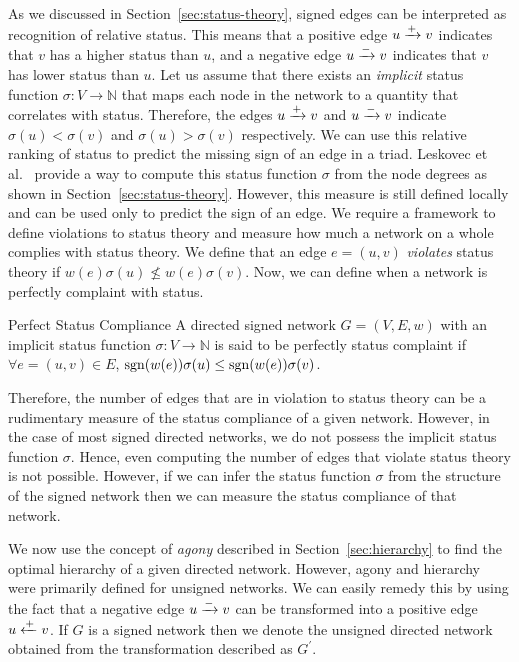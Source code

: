 As we discussed in Section~\ref{sec:status-theory}, signed edges can be interpreted as recognition of relative status.
This means that a positive edge $u \xrightarrow{+} v$ indicates that $v$ has a higher status than $u$, and a negative edge $u \xrightarrow{-} v$ indicates that $v$ has lower status than $u$.
Let us assume that there exists an \textit{implicit} status function $\sigma: V \rightarrow \mathbb{N}$ that maps each node in the network to a quantity that correlates with status.
Therefore, the edges $u\xrightarrow{+} v$ and $u \xrightarrow{-} v$ indicate $\sigma(u)<\sigma(v)$ and $\sigma(u)>\sigma(v)$ respectively.
We can use this relative ranking of status to predict the missing sign of an edge in a triad.
Leskovec et al.\ \cite{leskovec2010signed} provide a way to compute this status function $\sigma$ from the node degrees as shown in Section~\ref{sec:status-theory}.
However, this measure is still defined locally and can be used only to predict the sign of an edge.
We require a framework to define violations to status theory and measure how much a network on a whole complies with status theory.
We define that an edge $e=(u,v)$ \textit{violates} status theory if $w(e)\sigma(u)\not\leq w(e)\sigma(v)$.
Now, we can define when a network is perfectly complaint with status.

 \theoremstyle{definition}
 \begin{definition}{Perfect Status Compliance}
     A directed signed network $G=(V,E,w)$ with an implicit status function $\sigma: V \rightarrow \mathbb{N}$ is said to be perfectly status complaint if $\forall e=(u,v) \in E$, $\operatorname*{sgn}(w(e))\sigma(u) \leq \operatorname*{sgn}(w(e))\sigma(v)$.
 \end{definition}

Therefore, the number of edges that are in violation to status theory can be a rudimentary measure of the status compliance of a given network.
However, in the case of most signed directed networks, we do not possess the implicit status function $\sigma$.
Hence, even computing the number of edges that violate status theory is not possible.
However, if we can infer the status function $\sigma$ from the structure of the signed network then we can measure the status compliance of that network. 

We now use the concept of \textit{agony} described in Section~\ref{sec:hierarchy} to find the optimal hierarchy of a given directed network.
However, agony and hierarchy were primarily defined for unsigned networks.
We can easily remedy this by using the fact that a negative edge $u \xrightarrow{-} v$ can be transformed into a positive edge $u \xleftarrow{+} v$.
If $G$ is a signed network then we denote the unsigned directed network obtained from the transformation described as $G^\prime$.

